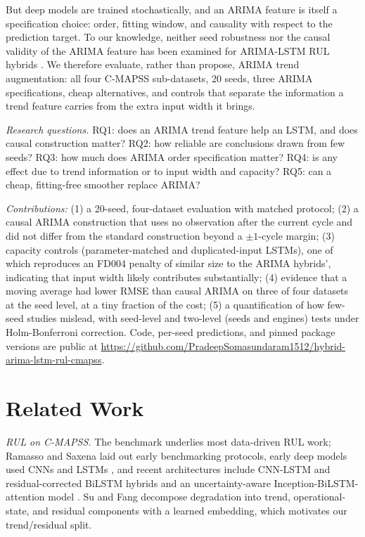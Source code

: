 \documentclass[conference]{IEEEtran}
\newif\ifblind\blindfalse
\begin{document}
But deep models are trained stochastically, and an ARIMA feature is itself a specification choice: order, fitting window, and causality with respect to the prediction target. To our knowledge, neither seed robustness nor the causal validity of the ARIMA feature has been examined for ARIMA-LSTM RUL hybrids \cite{arimalstmvalve2022}. We therefore evaluate, rather than propose, ARIMA trend augmentation: all four C-MAPSS sub-datasets, 20 seeds, three ARIMA specifications, cheap alternatives, and controls that separate the information a trend feature carries from the extra input width it brings.

\emph{Research questions.} RQ1: does an ARIMA trend feature help an LSTM, and does causal construction matter? RQ2: how reliable are conclusions drawn from few seeds? RQ3: how much does ARIMA order specification matter? RQ4: is any effect due to trend information or to input width and capacity? RQ5: can a cheap, fitting-free smoother replace ARIMA?

\emph{Contributions:} (1) a 20-seed, four-dataset evaluation with matched protocol; (2) a causal ARIMA construction that uses no observation after the current cycle and did not differ from the standard construction beyond a $\pm1$-cycle margin; (3) capacity controls (parameter-matched and duplicated-input LSTMs), one of which reproduces an FD004 penalty of similar size to the ARIMA hybrids', indicating that input width likely contributes substantially; (4) evidence that a moving average had lower RMSE than causal ARIMA on three of four datasets at the seed level, at a tiny fraction of the cost; (5) a quantification of how few-seed studies mislead, with seed-level and two-level (seeds and engines) tests under Holm-Bonferroni correction. Code, per-seed predictions, and pinned package versions are public at \ifblind [repository URL withheld for blind review]\else\url{https://github.com/PradeepSomasundaram1512/hybrid-arima-lstm-rul-cmapss}\fi.

\section{Related Work}
\emph{RUL on C-MAPSS.} The benchmark \cite{saxena2008} underlies most data-driven RUL work; Ramasso and Saxena \cite{cmapssbenchmark2014} laid out early benchmarking protocols, early deep models used CNNs \cite{babu2016} and LSTMs \cite{zheng2017}, and recent architectures include CNN-LSTM \cite{cnnlstm2024} and residual-corrected BiLSTM \cite{biclstm2026} hybrids and an uncertainty-aware Inception-BiLSTM-attention model \cite{sharma2025}. Su and Fang \cite{multiheadattn2026} decompose degradation into trend, operational-state, and residual components with a learned embedding, which motivates our trend/residual split.
\end{document}
